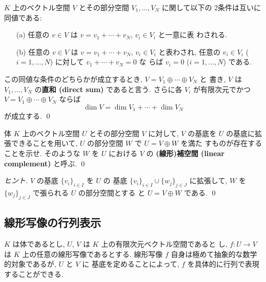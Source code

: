 \documentclass[12pt,twoside]{jarticle}
\begin{document}
\begin{question}[直和, 5点]
  $K$ 上のベクトル空間 $V$ とその部分空間 $V_1,\ldots,V_N$ に関して以下の
  2条件は互いに同値である:
  \begin{enumerate}
  \item[(a)] 任意の $v\in V$ は $v=v_1+\cdots+v_N$, $v_i\in V_i$ と一意に表
    わされる.
  \item[(b)] 任意の $v\in V$ は $v=v_1+\cdots+v_N$, $v_i\in V_i$ と表わされ,
    任意の $v_i\in V_i$ ($i=1,\ldots,N$) に対して $v_1+\cdots+v_N=0$ な
    らば $v_i=0$ ($i=1,\ldots,N$) である.
  \end{enumerate}
  この同値な条件のどちらかが成立するとき, $V=V_1\oplus\cdots\oplus V_N$ と
  書き, $V$ は $V_1,\ldots,V_N$ の{\bf 直和 (direct sum)} であると言う.
  さらに各 $V_i$ が有限次元でかつ $V=V_1\oplus\cdots\oplus V_N$ ならば
  \begin{equation*}
    \dim V = \dim V_1 + \cdots + \dim V_N
  \end{equation*}
  が成立する. \qed
\end{question}


\begin{question}[補空間の存在, 10点]
  \label{q:complement}
  体 $K$ 上のベクトル空間 $U$ とその部分空間 $V$ に対して, $V$ の基底を $U$ 
  の基底に拡張できることを用いて, $U$ の部分空間 $W$ で $U=V\oplus W$ を満た
  すものが存在することを示せ. 
  そのような $W$ を $U$ における $V$ の
  {\bf (線形)補空間 (linear complement)} と呼ぶ.
  \qed
\end{question}

\begin{proof}[ヒント]
  $V$ の基底 $\{v_i\}_{i\in I}$ を $U$ の
  基底 $\{v_i\}_{i\in I}\cup\{w_j\}_{j\in J}$ に拡張して,
  $W$ を $\{w_j\}_{j\in J}$ で張られる $U$ の部分空間とする
  と $U=V\oplus W$ である.
  \qed
\end{proof}


\subsection{線形写像の行列表示}
\label{sec:matrix-rep}

$K$ は体であるとし, $U$, $V$ は $K$ 上の有限次元ベクトル空間であると
し, $f:U\to V$ は $K$ 上の任意の線形写像であるとする. 
線形写像 $f$ 自身は極めて抽象的な数学的対象であるが, $U$ と $V$ に
基底を定めることによって, $f$ を具体的に行列で表現することができる. 
\end{document}
